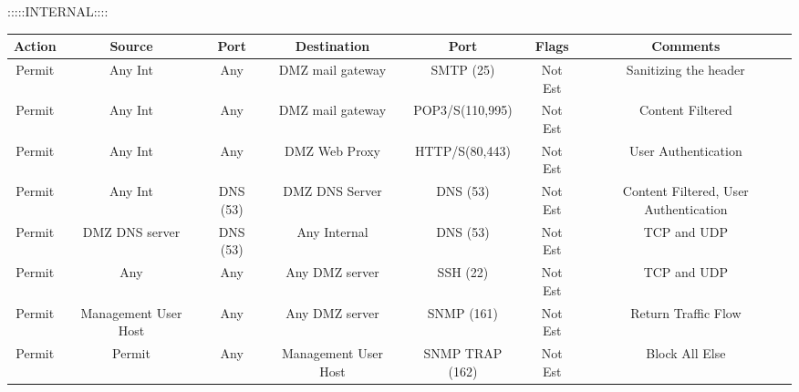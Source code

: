 \documentclass[12pt]{article}
\begin{document}
\begin{description}
    
        :::::INTERNAL::::
    \begin{center}
    \fontsize{8}{12}\selectfont
      \begin{tabular}{|c|c|c|c|c|c|c|}
        \hline
        \textbf{Action} & \textbf{Source} & \textbf{Port} & \textbf{Destination} & \textbf{Port} & \textbf{Flags} & \textbf{Comments} \\
        \hline
        Permit & Any Int & Any & DMZ mail gateway & SMTP (25) & Not Est & Sanitizing the header \\
        Permit & Any Int& Any & DMZ mail gateway & POP3/S(110,995)  & Not Est & Content Filtered \\
        Permit & Any Int& Any & DMZ Web Proxy & HTTP/S(80,443) & Not Est & User Authentication\\
        Permit & Any Int& DNS (53) & DMZ DNS Server & DNS (53) & Not Est & Content Filtered, User Authentication \\
        Permit & DMZ DNS server & DNS (53) & Any Internal & DNS (53) & Not Est &  TCP and UDP\\
        Permit & Any & Any & Any DMZ server & SSH (22) & Not Est &  TCP and UDP \\
        Permit & Management User Host & Any & Any DMZ server & SNMP (161) & Not Est & Return Traffic Flow \\
        Permit & Permit & Any & Management User Host & SNMP TRAP (162) & Not Est & Block All Else\\
        \hline
      \end{tabular}
    \end{center} \par
    
\end{description}
\end{document}

